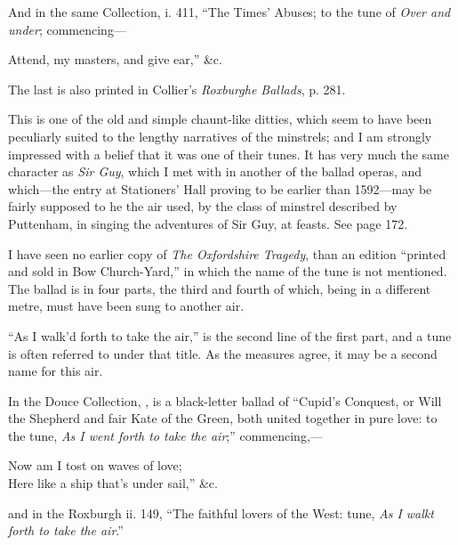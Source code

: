 And in the same Collection, i. 411, “The Times’ Abuses; to the tune of \textit{Over and
under}; commencing—
\begin{scverse}Attend, my masters, and give ear,” \&c.
\end{scverse}
The last is also printed in Collier’s \textit{Roxburghe Ballads}, p. 281.

\pagebreak




\vspace{-\baselineskip}


This is one of the old and simple chaunt-like ditties, which seem to have been
peculiarly suited to the lengthy narratives of the minstrels; and I am strongly
impressed with a belief that it was one of their tunes. It has very much the same
character as \textit{Sir Guy}, which I met with in another of the ballad operas, and
which—the entry at Stationers’ Hall proving to be earlier than 1592—may be
fairly supposed to he the air used, by the class of minstrel described by Puttenham,
in singing the adventures of Sir Guy, at feasts. See page 172.

I have seen no earlier copy of \textit{The Oxfordshire Tragedy}, than an edition
“printed and sold in Bow Church-Yard,” in which the name of the tune is not
mentioned. The ballad is in four parts, the third and fourth of which, being in
a different metre, must have been sung to another air.

“As I walk’d forth to take the air,” is the second line of the first part,
and a tune is often referred to under that title. As the measures agree, it may
be a second name for this air.

In the Douce Collection, , is a black-letter ballad of “Cupid’s Conquest, or
Will the Shepherd and fair Kate of the Green, both united together in pure love:
to the tune, \textit{As I went forth to take the air};” commencing,—
\settowidth{\versewidth}{Now am I tost on waves of love;}
\begin{scverse}Now am I tost on waves of love;\\
\vin Here like a ship that’s under sail,” \&c.
\end{scverse}
and in the Roxburgh ii. 149, “The faithful lovers of the West: tune, \textit{As I walkt
forth to take the air}.”

